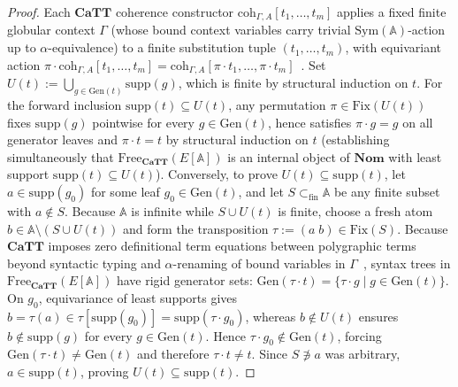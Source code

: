 \documentclass[10pt,twoside,openright]{book}
\theoremstyle{crmplain}
\theoremstyle{crmdef}
\theoremstyle{crmremark}
\begin{document}
\begin{proof}
Each $\mathbf{CaTT}$ coherence constructor $\mathrm{coh}_{\Gamma, A}[t_1, \dots, t_m]$ applies a fixed finite globular context $\Gamma$ (whose bound context variables carry trivial $\mathrm{Sym}(\mathbb{A})$-action up to $\alpha$-equivalence) to a finite substitution tuple $(t_1, \dots, t_m)$, with equivariant action $\pi \cdot \mathrm{coh}_{\Gamma, A}[t_1, \dots, t_m] = \mathrm{coh}_{\Gamma, A}[\pi \cdot t_1, \dots, \pi \cdot t_m]$~\cite{FinsterMimram17,BCM26}. Set $U(t) := \bigcup_{g \in \mathrm{Gen}(t)} \mathrm{supp}(g)$, which is finite by structural induction on $t$. For the forward inclusion $\mathrm{supp}(t) \subseteq U(t)$, any permutation $\pi \in \mathrm{Fix}(U(t))$ fixes $\mathrm{supp}(g)$ pointwise for every $g \in \mathrm{Gen}(t)$, hence satisfies $\pi \cdot g = g$ on all generator leaves and $\pi \cdot t = t$ by structural induction on $t$ (establishing simultaneously that $\mathrm{Free}_{\mathbf{CaTT}}(E[\mathbb{A}])$ is an internal object of $\mathbf{Nom}$ with least support $\mathrm{supp}(t) \subseteq U(t)$). Conversely, to prove $U(t) \subseteq \mathrm{supp}(t)$, let $a \in \mathrm{supp}(g_0)$ for some leaf $g_0 \in \mathrm{Gen}(t)$, and let $S \subset_{\mathrm{fin}} \mathbb{A}$ be any finite subset with $a \notin S$. Because $\mathbb{A}$ is infinite while $S \cup U(t)$ is finite, choose a fresh atom $b \in \mathbb{A} \setminus (S \cup U(t))$ and form the transposition $\tau := (a \; b) \in \mathrm{Fix}(S)$. Because $\mathbf{CaTT}$ imposes zero definitional term equations between polygraphic terms beyond syntactic typing and $\alpha$-renaming of bound variables in $\Gamma$~\cite{FinsterMimram17,BCM26}, syntax trees in $\mathrm{Free}_{\mathbf{CaTT}}(E[\mathbb{A}])$ have rigid generator sets: $\mathrm{Gen}(\tau \cdot t) = \{\tau \cdot g \mid g \in \mathrm{Gen}(t)\}$. On $g_0$, equivariance of least supports gives $b = \tau(a) \in \tau[\mathrm{supp}(g_0)] = \mathrm{supp}(\tau \cdot g_0)$, whereas $b \notin U(t)$ ensures $b \notin \mathrm{supp}(g)$ for every $g \in \mathrm{Gen}(t)$. Hence $\tau \cdot g_0 \notin \mathrm{Gen}(t)$, forcing $\mathrm{Gen}(\tau \cdot t) \neq \mathrm{Gen}(t)$ and therefore $\tau \cdot t \neq t$. Since $S \not\ni a$ was arbitrary, $a \in \mathrm{supp}(t)$, proving $U(t) \subseteq \mathrm{supp}(t)$.
\end{proof}
\end{document}
